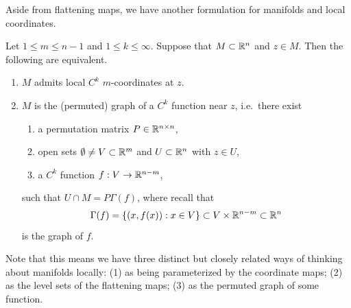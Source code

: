 \documentclass[a4paper]{article}
\begin{document}
Aside from flattening maps, we have another formulation for manifolds and
local coordinates.
\begin{thm}
  Let $1 \leq m \leq n-1$ and $1 \leq k \leq \infty$. Suppose that $M
    \subset \mathbb{R}^n$ and $z \in M$. Then the following are equivalent.
  \begin{enumerate}
    \item $M$ admits local $C^k$ $m$-coordinates at $z$.
    \item $M$ is the (permuted) graph of a $C^k$ function near
          $z$, i.e.\ there exist
          \begin{enumerate}
            \item a permutation matrix $P \in \mathbb{R}^{n \times n}$,
            \item open sets $\emptyset \neq V \subset \mathbb{R}^m$ and $U \subset
                  \mathbb{R}^n$ with $z \in U$,
            \item a $C^k$ function $f : V \to \mathbb{R}^{n-m}$,
          \end{enumerate}
          such that $U \cap M = P \Gamma(f)$, where recall that
          \[
            \Gamma(f) = \{(x,f(x)) : x \in V\} \subset V \times
            \mathbb{R}^{n-m} \subset \mathbb{R}^n
          \]
          is the graph of $f$.
  \end{enumerate}
\end{thm}

Note that this means we have three distinct but closely related ways of
thinking about manifolds locally: (1) as being parameterized by the
coordinate maps; (2) as the level sets of the flattening maps; (3) as the
permuted graph of some function.
\end{document}
